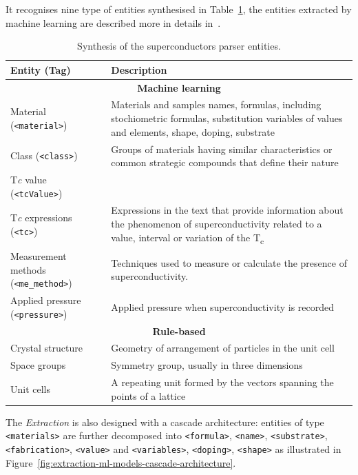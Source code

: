 \documentclass{article}
\begin{document}
It recognises nine type of entities synthesised in Table~\ref{tab:superconductors-model-entities}, the entities extracted by machine learning are described more in details in~\cite{foppiano2021supermat}.

\begin{table}[ht]
\centering
\begin{tabular}{m{10em} m{25em}}
\hline 
\textbf{Entity} (\textbf{Tag})& \textbf{Description} \\ 
\hline
\hline
\multicolumn{2}{c}{\textbf{Machine learning}} \\
\hline
Material (\texttt{<material>}) & Materials and samples names, formulas, including stochiometric formulas, substitution variables of values and elements, shape, doping, substrate \\
Class (\texttt{<class>}) & Groups of materials having similar characteristics or common strategic compounds that define their nature \\
T\textit{c} value (\texttt{<tcValue>})& \\
T\textit{c} expressions (\texttt{<tc>}) & Expressions in the text that provide information about the phenomenon of superconductivity related to a value, interval or variation of the T\textsubscript{c}\\
Measurement methods (\texttt{<me\_method>}) & Techniques used to measure or calculate the presence of superconductivity. \\
Applied pressure (\texttt{<pressure>}) & Applied pressure when superconductivity is recorded\\
\hline
\hline
\multicolumn{2}{c}{\textbf{Rule-based}} \\
\hline
Crystal structure & Geometry of arrangement of particles in the unit cell\\
Space groups  & Symmetry group, usually in three dimensions\\
Unit cells & A repeating unit formed by the vectors spanning the points of a lattice\\
\hline
\end{tabular}
\label{tab:superconductors-model-entities}
\caption{Synthesis of the superconductors parser entities. }
\end{table}

The \textit{Extraction} is also designed with a cascade architecture: entities of type \texttt{<materials>} are further decomposed into \texttt{<formula>}, \texttt{<name>}, \texttt{<substrate>}, \texttt{<fabrication>}, \texttt{<value>} and \texttt{<variables>}, \texttt{<doping>}, \texttt{<shape>} as illustrated in Figure~\ref{fig:extraction-ml-models-cascade-architecture}.
\end{document}
